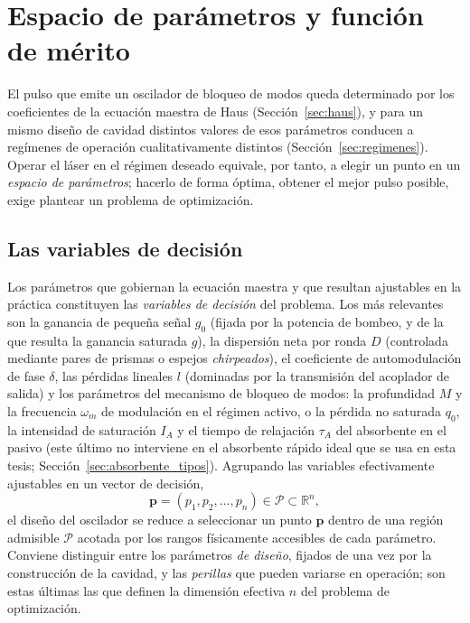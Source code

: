 
\section{Espacio de parámetros y función de mérito}
\label{sec:espacio_parametros}

El pulso que emite un oscilador de bloqueo de modos queda determinado por los coeficientes de la ecuación maestra de Haus (Sección~\ref{sec:haus}), y para un mismo diseño de cavidad distintos valores de esos parámetros conducen a regímenes de operación cualitativamente distintos (Sección~\ref{sec:regimenes}). Operar el láser en el régimen deseado equivale, por
tanto, a elegir un punto en un \emph{espacio de parámetros}; hacerlo de forma
óptima, obtener el mejor pulso posible, exige plantear un problema de optimización.


\subsection{Las variables de decisión}
\label{sec:variables}

Los parámetros que gobiernan la ecuación maestra y que resultan ajustables en la
práctica constituyen las \emph{variables de decisión} del problema. Los más
relevantes son la ganancia de pequeña señal $g_0$ (fijada por la potencia de bombeo,
y de la que resulta la ganancia saturada $g$), la
dispersión neta por ronda $D$ (controlada mediante pares de prismas o espejos
\emph{chirpeados}), el coeficiente de automodulación de fase $\delta$, las pérdidas
lineales $l$ (dominadas por la transmisión del acoplador de salida) y los
parámetros del mecanismo de bloqueo de modos: la profundidad $M$ y la frecuencia
$\omega_m$ de modulación en el régimen activo, o la pérdida no saturada $q_0$, la
intensidad de saturación $I_A$ y el tiempo de relajación $\tau_A$ del absorbente en
el pasivo (este último no interviene en el absorbente rápido ideal que se usa en esta
tesis; Sección~\ref{sec:absorbente_tipos}). Agrupando las variables efectivamente ajustables en un vector de
decisión,
%
\begin{equation}
    \mathbf{p} = (p_1, p_2, \dots, p_n)
    \in \mathcal{P} \subset \mathbb{R}^{n},
    \label{eq:vector_decision}
\end{equation}
%
el diseño del oscilador se reduce a seleccionar un punto $\mathbf{p}$ dentro de una
región admisible $\mathcal{P}$ acotada por los rangos físicamente accesibles de
cada parámetro. Conviene distinguir entre los parámetros \emph{de diseño}, fijados
de una vez por la construcción de la cavidad, y las \emph{perillas} que pueden
variarse en operación; son estas últimas las que definen la dimensión efectiva $n$
del problema de optimización.

